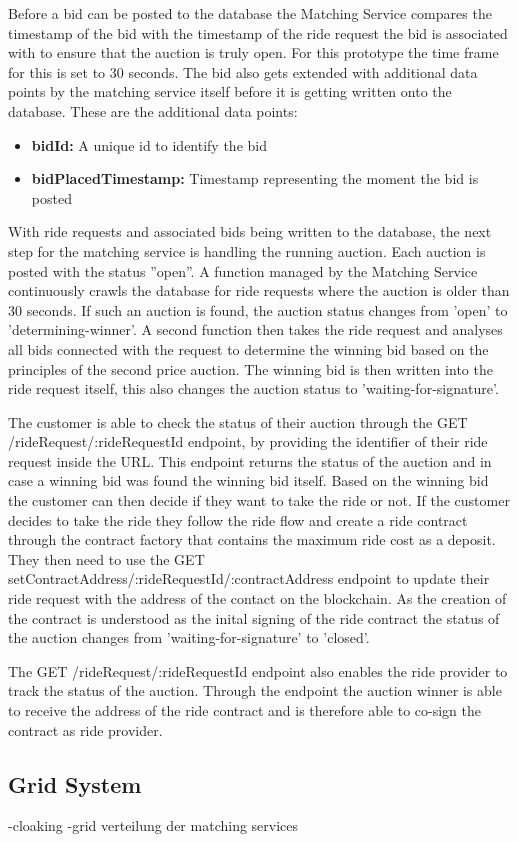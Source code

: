 Before a bid can be posted to the database the Matching Service compares the timestamp of the bid with the timestamp of the ride request the bid is associated with to ensure that the auction is truly open. For this prototype the time frame for this is set to 30 seconds. The bid also gets extended with additional data points by the matching service itself before it is getting written onto the database. These are the additional data points:

\begin{itemize}
    \item \textbf{bidId:} A unique id to identify the bid
    \item \textbf{bidPlacedTimestamp:} Timestamp representing the moment the bid is posted
\end{itemize}

With ride requests and associated bids being written to the database, the next step for the matching service is handling the running auction. Each auction is posted with the status ''open''. A function managed by the Matching Service continuously crawls the database for ride requests where the auction is older than 30 seconds. If such an auction is found, the auction status changes from 'open' to 'determining-winner'. A second function then takes the ride request and analyses all bids connected with the request to determine the winning bid based on the principles of the second price auction. The winning bid is then written into the ride request itself, this also changes the auction status to 'waiting-for-signature'. 

The customer is able to check the status of their auction through the GET /rideRequest/:rideRequestId endpoint, by providing the identifier of their ride request inside the URL. This endpoint returns the status of the auction and in case a winning bid was found the winning bid itself. Based on the winning bid the customer can then decide if they want to take the ride or not. If the customer decides to take the ride they follow the ride flow and create a ride contract through the contract factory that contains the maximum ride cost as a deposit. They then need to use the GET setContractAddress/:rideRequestId/:contractAddress endpoint to update their ride request with the address of the contact on the blockchain. As the creation of the contract is understood as the inital signing of the ride contract the status of the auction changes from 'waiting-for-signature' to 'closed'. 

The GET /rideRequest/:rideRequestId endpoint also enables the ride provider to track the status of the auction. Through the endpoint the auction winner is able to receive the address of the ride contract and is therefore able to co-sign the contract as ride provider.

\subsection{Grid System}
-cloaking 
-grid verteilung der matching services 